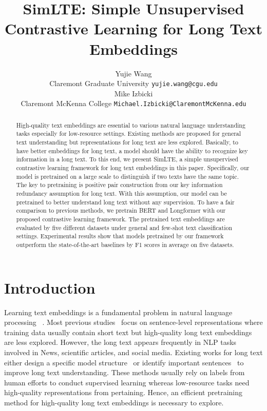 \documentclass[11pt]{article}
\title{SimLTE: Simple Unsupervised Contrastive Learning for Long Text Embeddings}
\author{Yujie Wang \\
  Claremont Graduate University 
  \texttt{yujie.wang@cgu.edu} \\\And
  Mike Izbicki \\
  Claremont McKenna College
  \texttt{Michael.Izbicki@ClaremontMcKenna.edu} \\}
\newcommand{\todo}[1]{{\color{red}{#1}}}
\begin{document}
\maketitle
\begin{abstract}
High-quality text embeddings are essential to various natural language understanding tasks especially for low-resource settings. 
Existing methods are proposed for general text understanding but representations for long text are less explored.
Basically, to have better embeddings for long text, a model should have the ability to recognize key information in a long text. 
To this end, we present SimLTE, a simple unsupervised contrastive learning framework for long text embeddings in this paper. 
Specifically, our model is pretrained on a large scale to distinguish if two texts have the same topic. 
The key to pretraining is positive pair construction from our key information redundancy assumption for long text. 
With this assumption, our model can be pretrained to better understand long text without any supervision.
To have a fair comparison to previous methods, we pretrain BERT and Longformer with our proposed contrastive learning framework. The pretrained text embeddings are evaluated by five different datasets under general and few-shot text classification settings.
Experimental results show that models pretrained by our framework outperform the state-of-the-art baselines by \todo{NUM} F1 scores in average on five datasets.


\end{abstract}

\section{Introduction}
Learning text embeddings is a fundamental problem in natural language processing ~\cite{Kiros2015SkipThoughtV, Hill2016LearningDR, Conneau2018SentEvalAE, Logeswaran2018AnEF, Gao2021SimCSESC, Reimers2016TaskOrientedIE}. 
Most previous studies~\cite{Hill2016LearningDR, Logeswaran2018AnEF, Gao2021SimCSESC} focus on sentence-level representations where training data usually contain short text but high-quality long text embeddings are less explored.
However, the long text appears frequently in NLP tasks involved in News, scientific articles, and social media. 
Existing works for long text either design a specific model structure~\cite{Pappagari2019HierarchicalTF, Grail2021GlobalizingBT, Rohde2021HierarchicalLF, Fang2019HierarchicalGN, Ainslie2020ETCEL} or identify important sentences~\cite{Ding2020CogLTXAB, Zaheer2020BigBT, Gidiotis2020ADA, Huang2021EfficientAF, Zhong2021DialogLMPM} to improve long text understanding. These methods usually rely on labels from human efforts to conduct supervised learning whereas low-resource tasks need high-quality representations from pertaining. Hence, an efficient pretraining method for high-quality long text embeddings is necessary to explore.
\end{document}
